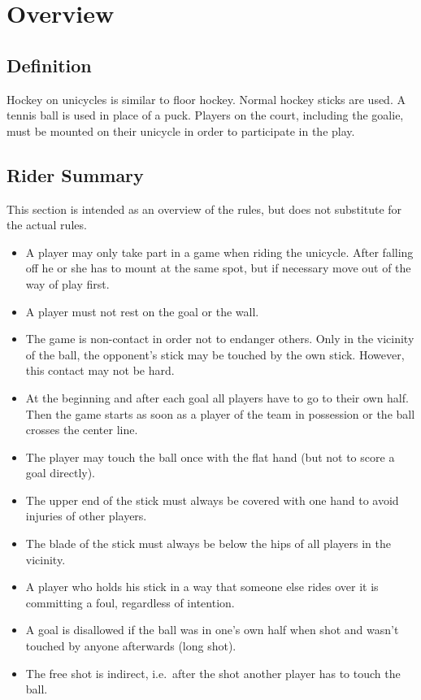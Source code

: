 \chapter{Overview}

\section{Definition}

Hockey on unicycles is similar to floor hockey.
Normal hockey sticks are used.
A tennis ball is used in place of a puck.
Players on the court, including the goalie, must be mounted on their unicycle in order to participate in the play.

\section{Rider Summary}

This section is intended as an overview of the rules, but does not substitute for the actual rules.
\begin{itemize}
\item A player may only take part in a game when riding the unicycle.
 After falling off he or she has to mount at the same spot, but if necessary move out of the way of play first.
\item A player must not rest on the goal or the wall.
\item The game is non-contact in order not to endanger others.
  Only in the vicinity of the ball, the opponent's stick may be touched by the own stick.
  However, this contact may not be hard.
\item At the beginning and after each goal all players have to go to their own half.
  Then the game starts as soon as a player of the team in possession or the ball crosses the center line.
\item The player may touch the ball once with the flat hand (but not to score a goal directly).
\item The upper end of the stick must always be covered with one hand to avoid injuries of other players.
\item The blade of the stick must always be below the hips of all players in the vicinity.
\item A player who holds his stick in a way that someone else rides over it is committing a foul, regardless of intention.
\item A goal is disallowed if the ball was in one's own half when shot and wasn't touched by anyone afterwards (long shot).
\item The free shot is indirect, i.e.\ after the shot another player has to touch the ball.
\end{itemize}
